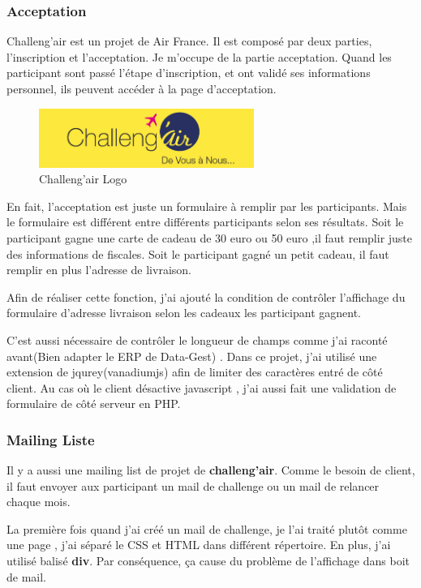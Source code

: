 \subsubsection{Acceptation}
Challeng'air est un projet de Air France.  Il est composé par deux parties, l'inscription et l'acceptation. Je m'occupe de la partie acceptation.
Quand les participant sont passé l'étape d'inscription, et ont validé ses informations personnel, ils peuvent accéder à la page d'acceptation. 
\begin{figure}[hbtp]
\caption{Challeng'air Logo}
\center
\includegraphics[width=7cm]{body/images/challengair.png}
\end{figure}

En fait, l'acceptation est juste un formulaire à remplir par les participants.  Mais le formulaire est différent entre différents participants selon ses résultats. Soit le participant gagne une carte de cadeau de 30 euro ou 50 euro ,il faut remplir juste des informations de fiscales. Soit le participant gagné un petit cadeau, il faut remplir en plus l'adresse de livraison. 

Afin de réaliser cette fonction, j'ai ajouté la condition de contrôler l'affichage du formulaire d'adresse livraison  selon les cadeaux les participant gagnent. 

C'est aussi nécessaire de contrôler le longueur de champs comme j'ai raconté avant(Bien adapter le ERP de Data-Gest) . Dans ce projet, j'ai utilisé une extension de jqurey(vanadiumjs) afin de limiter des caractères entré de côté client. Au cas où le client désactive javascript , j'ai aussi fait une validation de formulaire de côté serveur en PHP.

\subsubsection{Mailing Liste}
Il y a aussi une mailing list de projet de \textbf{challeng'air}. Comme le besoin de client, il faut envoyer aux participant un  mail de challenge ou un mail de relancer chaque mois. 

La première fois quand j'ai créé un mail de challenge, je l'ai traité plutôt comme une page , j'ai séparé le CSS et  HTML dans différent répertoire. En plus, j'ai utilisé balisé \textbf{div}. Par conséquence, ça cause du problème de l'affichage dans boit de mail.

